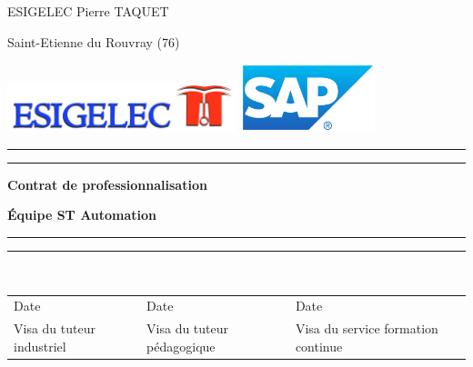 
\begin{titlepage}
\parindent=0pt

ESIGELEC  Pierre TAQUET

Saint-Etienne du Rouvray (76)

\includegraphics[width=0.5\textwidth]{images/ESIGELEC.jpg}
\includegraphics[height=75px]{images/SAP.png}

\rule{\textwidth}{1.6pt}\vspace*{-\baselineskip}\vspace*{2pt} %
\rule{\textwidth}{0.4pt}%
\begin{center}\bfseries\Huge
Contrat de professionnalisation
\end{center}
\hrulefill
\begin{center}\bfseries\LARGE
\'{E}quipe ST Automation
\end{center}
\rule{\textwidth}{0.4pt}\vspace*{-\baselineskip}\vspace{3.2pt} %
\rule{\textwidth}{1.6pt}\\[\baselineskip] %

		


\begin{table}[b!]
\begin{center}
\begin{tabular}{|l|l|l|}
\hline
Date & Date & Date \\

Visa du tuteur industriel & Visa du tuteur pédagogique & Visa du service formation continue \\[50pt]
\hline
\end{tabular}
\end{center}
\end{table}

\end{titlepage}
\restoregeometry